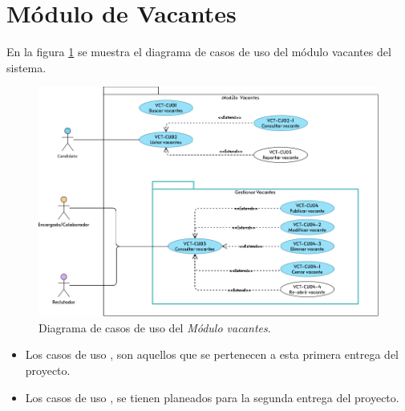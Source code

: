 



\section{Módulo de Vacantes}
	En la figura \ref{adcu:usr} se muestra el diagrama de casos de uso del módulo vacantes del sistema.

	\begin{figure}[hbtp!]
		\begin{center}
			\includegraphics[width=.8\textwidth]{sprints/imagenes/MUVCT.png}
		\end{center}
		
		\caption{Diagrama de casos de uso del \textit{Módulo vacantes}.}
		\label{adcu:usr}
	\end{figure}

	\begin{itemize}
        \item Los casos de uso \IUazul{} , son aquellos que se pertenecen a esta primera entrega del proyecto.
        \item Los casos de uso \IUblanco{}, se tienen planeados para la segunda entrega del proyecto.
    \end{itemize} 

	
	

	
	

